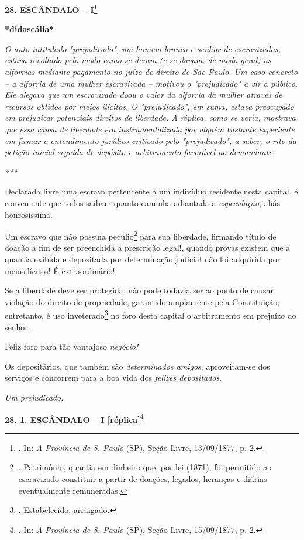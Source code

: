 \textbf{28. ESCÂNDALO -- I}\footnote{. In: \emph{A Província de S.
  Paulo} (SP), Seção Livre, 13/09/1877, p. 2.}

\textbf{*didascália*}

\emph{O auto-intitulado "prejudicado", um homem branco e senhor de
escravizados, estava revoltado pelo modo como se deram (e se davam, de
modo geral) as alforrias mediante pagamento no juízo de direito de São
Paulo. Um caso concreto -- a alforria de uma mulher escravizada --
motivou o "prejudicado" a vir a público. Ele alegava que um escravizado
doou o valor da alforria da mulher através de recursos obtidos por meios
ilícitos. O "prejudicado", em suma, estava preocupado em prejudicar
potenciais direitos de liberdade. A réplica, como se veria, mostrava que
essa causa de liberdade era instrumentalizada por alguém bastante
experiente em firmar o entendimento jurídico criticado pelo
"prejudicado", a saber, o rito da petição inicial seguida de depósito e
arbitramento favorável ao demandante.}

\emph{***}

Declarada livre uma escrava pertencente a um indivíduo residente nesta
capital, é conveniente que todos saibam quanto caminha adiantada a
\emph{especulação}, aliás honrosíssima.

Um escravo que não possuía pecúlio\footnote{. Patrimônio, quantia em
  dinheiro que, por lei (1871), foi permitido ao escravizado constituir
  a partir de doações, legados, heranças e diárias eventualmente
  remuneradas.} para sua liberdade, firmando título de doação a fim de
ser preenchida a prescrição legal!, quando provas existem que a quantia
exibida e depositada por determinação judicial não foi adquirida por
meios lícitos! É extraordinário!

Se a liberdade deve ser protegida, não pode todavia ser ao ponto de
causar violação do direito de propriedade, garantido amplamente pela
Constituição; entretanto, é uso inveterado\footnote{. Estabelecido,
  arraigado.} n\protect\hypertarget{Secao_Sem_Titulo-38}{}{}o foro desta
capital o arbitramento em prejuízo do senhor.

Feliz foro para tão vantajoso \emph{negócio!}

Os depositários, que também são \emph{determinados amigos},
aproveitam-se dos serviços e concorrem para a boa vida dos \emph{felizes
depositados}.

\emph{Um prejudicado.}

\textbf{28. 1. ESCÂNDALO -- I {[}réplica{]}}\footnote{. In: \emph{A
  Província de S. Paulo} (SP), Seção Livre, 15/09/1877, p. 2.}

